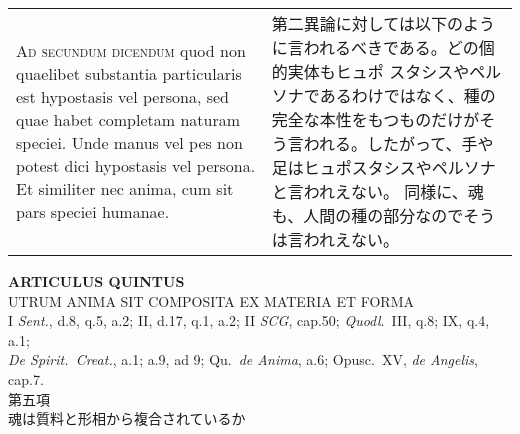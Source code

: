 \documentclass[10pt]{jsarticle} %
\begin{document}
\begin{longtable}{p{21em}p{21em}}
\\




{\scshape Ad secundum dicendum} quod non quaelibet substantia
particularis est hypostasis vel persona, sed quae habet completam
naturam speciei. Unde manus vel pes non potest dici hypostasis vel
persona. Et similiter nec anima, cum sit pars speciei humanae.


&

第二異論に対しては以下のように言われるべきである。どの個的実体もヒュポ
スタシスやペルソナであるわけではなく、種の完全な本性をもつものだけがそ
う言われる。したがって、手や足はヒュポスタシスやペルソナと言われえない。
同様に、魂も、人間の種の部分なのでそうは言われえない。




\end{longtable}
\newpage





\begin{center}
{\Large {\bf ARTICULUS QUINTUS}}\\
{\large UTRUM ANIMA SIT COMPOSITA EX MATERIA ET FORMA}\\
{\footnotesize I {\itshape Sent.}, d.8, q.5, a.2; II, d.17, q.1, a.2; II {\itshape SCG}, cap.50; {\itshape Quodl}.~III, q.8; IX, q.4, a.1;\\ {\itshape De Spirit.~Creat.}, a.1; a.9, ad 9; Qu.~{\itshape de Anima}, a.6; Opusc.~XV, {\itshape de Angelis}, cap.7.}\\
{\Large 第五項\\魂は質料と形相から複合されているか}
\end{center}
\end{document}
